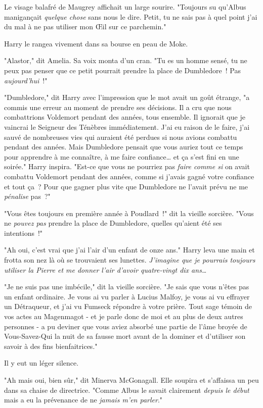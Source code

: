 Le visage balafré de Maugrey affichait un large sourire. "Toujours su qu'Albus manigançait \emph{quelque chose} sans nous le dire. Petit, tu ne sais pas à quel point j'ai du mal à ne pas utiliser mon Œil sur ce parchemin."

Harry le rangea vivement dans sa bourse en peau de Moke.

"Alastor," dit Amelia. Sa voix monta d'un cran. "Tu es un homme sensé, tu ne peux pas penser que ce petit pourrait prendre la place de Dumbledore~! Pas \emph{aujourd'hui}~!"

"Dumbledore," dit Harry avec l'impression que le mot avait un goût étrange, "a commis une erreur au moment de prendre ses décisions. Il a cru que nous combattrions Voldemort pendant des années, tous ensemble. Il ignorait que je vaincrai le Seigneur des Ténèbres immédiatement. J'ai eu raison de le faire, j'ai sauvé de nombreuses vies qui auraient été perdues si nous avions combattu pendant des années. Mais Dumbledore pensait que vous auriez tout ce temps pour apprendre à me connaître, à me faire confiance… et ça s'est fini en une soirée." Harry inspira. "Est-ce que vous ne pourriez pas \emph{faire comme si} on avait combattu Voldemort pendant des années, comme si j'avais gagné votre confiance et tout ça~? Pour que gagner plus vite que Dumbledore ne l'avait prévu ne me \emph{pénalise} pas~?"

"Vous êtes toujours en première année à Poudlard~!" dit la vieille sorcière. "Vous ne \emph{pouvez pas} prendre la place de Dumbledore, quelles qu'aient été ses intentions~!"

"Ah oui, c'est vrai que j'ai l'air d'un enfant de onze ans." Harry leva une main et frotta son nez là où se trouvaient ses lunettes. \emph{J'imagine que je pourrais toujours utiliser la Pierre et me donner l'air d'avoir quatre-vingt dix ans…}

"Je ne suis pas une imbécile," dit la vieille sorcière. "Je sais que vous n'êtes pas un enfant ordinaire. Je vous ai vu parler à Lucius Malfoy, je vous ai vu effrayer un Détraqueur, et j'ai vu Fumseck répondre à votre prière. Tout sage témoin de vos actes au Magenmagot - et je parle donc de moi et au plus de deux autres personnes - a pu deviner que vous aviez absorbé une partie de l'âme broyée de Vous-Savez-Qui la nuit de sa fausse mort avant de la dominer et d'utiliser son savoir à des fins bienfaitrices."

Il y eut un léger silence.

"Ah mais oui, bien sûr," dit Minerva McGonagall. Elle soupira et s'affaissa un peu dans sa chaise de directrice. "Comme Albus le savait clairement \emph{depuis le début} mais a eu la prévenance de ne \emph{jamais m'en parler}."

